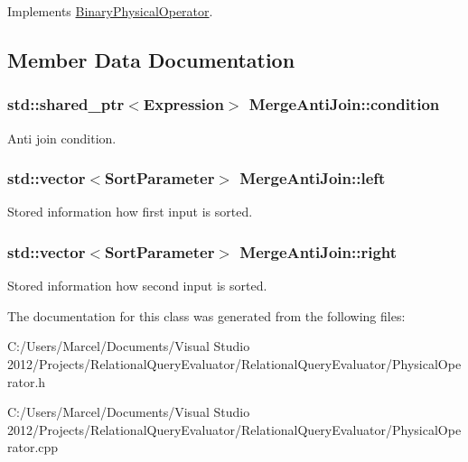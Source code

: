 Implements \hyperlink{class_binary_physical_operator_a29ec622920006cb5428bf2c259918347}{Binary\+Physical\+Operator}.



\subsection{Member Data Documentation}
\hypertarget{class_merge_anti_join_ae616cc88814ffd21b31ed48693ac60a6}{
\subsubsection[{condition}]{\setlength{\rightskip}{0pt plus 5cm}std\+::shared\+\_\+ptr$<${\bf Expression}$>$ Merge\+Anti\+Join\+::condition}}\label{class_merge_anti_join_ae616cc88814ffd21b31ed48693ac60a6}
Anti join condition. \hypertarget{class_merge_anti_join_a1dedfa039b1172db367fc7d3cd0304fc}{
\subsubsection[{left}]{\setlength{\rightskip}{0pt plus 5cm}std\+::vector$<${\bf Sort\+Parameter}$>$ Merge\+Anti\+Join\+::left}}\label{class_merge_anti_join_a1dedfa039b1172db367fc7d3cd0304fc}
Stored information how first input is sorted. \hypertarget{class_merge_anti_join_a28f20cf708052a9357799187831c8a33}{
\subsubsection[{right}]{\setlength{\rightskip}{0pt plus 5cm}std\+::vector$<${\bf Sort\+Parameter}$>$ Merge\+Anti\+Join\+::right}}\label{class_merge_anti_join_a28f20cf708052a9357799187831c8a33}
Stored information how second input is sorted. 

The documentation for this class was generated from the following files\+:\begin{DoxyCompactItemize}
\item 
C\+:/\+Users/\+Marcel/\+Documents/\+Visual Studio 2012/\+Projects/\+Relational\+Query\+Evaluator/\+Relational\+Query\+Evaluator/Physical\+Operator.\+h\item 
C\+:/\+Users/\+Marcel/\+Documents/\+Visual Studio 2012/\+Projects/\+Relational\+Query\+Evaluator/\+Relational\+Query\+Evaluator/Physical\+Operator.\+cpp\end{DoxyCompactItemize}
